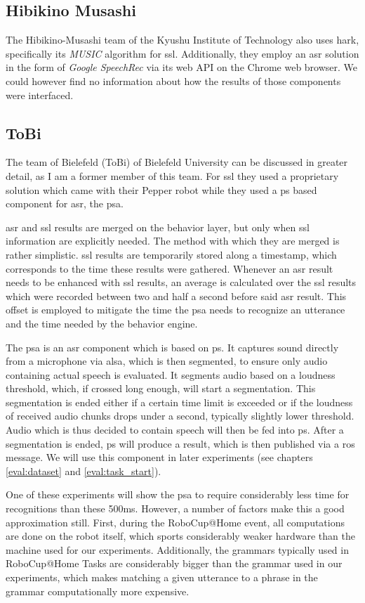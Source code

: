 \subsection{Hibikino Musashi}
The Hibikino-Musashi team of the Kyushu Institute of Technology also uses \gls{hark}, specifically its \textit{MUSIC} algorithm for \gls{ssl}.
Additionally, they employ an \gls{asr} solution in the form of \textit{Google SpeechRec} via its web API on the Chrome web browser.
We could however find no information about how the results of those components were interfaced.

\subsection{ToBi}
The team of Bielefeld (ToBi) of Bielefeld University can be discussed in greater detail, as I am a former member of this team.
For \gls{ssl} they used a proprietary solution which came with their Pepper robot %
while they used a \gls{ps} based component for \gls{asr}, the \gls{psa}. 

\gls{asr} and \gls{ssl} results are merged on the behavior layer, but only when \gls{ssl} information are explicitly needed.
The method with which they are merged is rather simplistic.
\gls{ssl} results are temporarily stored along a timestamp, which corresponds to the time these results were gathered.
Whenever an \gls{asr} result needs to be enhanced with \gls{ssl} results, an average is calculated over the \gls{ssl} results which were recorded between two and half a second before said \gls{asr} result.
This offset is employed to mitigate the time the \gls{psa} needs to recognize an utterance and the time needed by the behavior engine. 

The \gls{psa} is an \gls{asr} component which is based on \gls{ps}. \label{related_work:psa}
It captures sound directly from a microphone via \gls{alsa}, which is then segmented, to ensure only audio containing actual speech is evaluated.
It segments audio based on a loudness threshold, which, if crossed long enough, will start a segmentation.
This segmentation is ended either if a certain time limit is exceeded or if the loudness of received audio chunks drops under a second, typically slightly lower threshold.
Audio which is thus decided to contain speech will then be fed into \gls{ps}.
After a segmentation is ended, \gls{ps} will produce a result, which is then published via a \gls{ros} message.
We will use this component in later experiments (see chapters \ref{eval:dataset} and \ref{eval:task_start}).

One of these experiments will show the \gls{psa} to require considerably less time for recognitions than these 500ms.
However, a number of factors make this a good approximation still.
First, during the RoboCup@Home event, all computations are done on the robot itself, which sports considerably weaker hardware than the machine used for our experiments.
Additionally, the grammars typically used in RoboCup@Home Tasks are considerably bigger than the grammar used in our experiments, which makes matching a given utterance to a phrase in the grammar computationally more expensive.